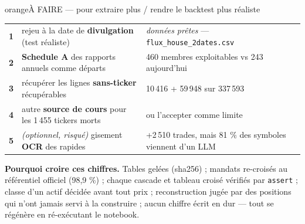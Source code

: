 \documentclass[10pt,a4paper]{article}
\begin{document}
\begin{bloc}{orange}{À FAIRE --- pour extraire plus / rendre le backtest plus réaliste}
\footnotesize
\begin{tabular}{@{}r l l@{}}
\textbf{1} & rejeu à la date de \textbf{divulgation} (test réaliste) & \emph{données prêtes} --- \texttt{flux\_house\_2dates.csv}\\
\textbf{2} & \textbf{Schedule A} des rapports annuels comme départs & 460 membres exploitables vs 243 aujourd'hui\\
\textbf{3} & récupérer les lignes \textbf{sans-ticker} récupérables & 10\,416 + 59\,948 sur 337\,593\\
\textbf{4} & autre \textbf{source de cours} pour les 1\,455 tickers morts & ou l'accepter comme limite\\
\textbf{5} & \emph{(optionnel, risqué)} gisement \textbf{OCR} des rapides & +2\,510 trades, mais 81 \% des symboles viennent d'un LLM\\
\end{tabular}
\end{bloc}

\vspace{1mm}
{\scriptsize\color{grisf} \textbf{Pourquoi croire ces chiffres.} Tables gelées (sha256) ; mandats re-croisés au
référentiel officiel (98,9 \%) ; chaque cascade et tableau croisé vérifiés par \texttt{assert} ; classe d'un actif
décidée avant tout prix ; reconstruction jugée par des positions qui n'ont jamais servi à la construire ; aucun
chiffre écrit en dur --- tout se régénère en ré-exécutant le notebook.}
\end{document}
